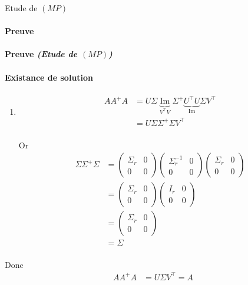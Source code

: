 \documentclass{article}
\newcommand{\img}{\operatorname{Im}}
\newenvironment{proof}[1][\unskip]{
	\def\temp{#1}\ifx\temp\empty
		\paragraph{Preuve}
	\else
		\paragraph{Preuve \emph{(#1)}}
	\fi

}{}
\begin{document}
\begin{proof}[Etude de $(MP)$]
    \paragraph{Existance de solution}
    \begin{enumerate}
        \item \begin{align*}
            A A^+ A &=  U \Sigma \underbrace{\img}_{V^\top V} \Sigma^+ \underbrace{U^\top U}_{\img} \Sigma V^\top \\
            &= U \Sigma \Sigma^+ \Sigma V^\top \\
        \end{align*}

        Or \begin{align*}
            \Sigma \Sigma^+ \Sigma &= \begin{pmatrix} \Sigma_r & 0 \\ 0 & 0 \end{pmatrix}  \begin{pmatrix} \Sigma_r^{-1} & 0 \\ 0 & 0 \end{pmatrix} \begin{pmatrix} \Sigma_r & 0 \\ 0 & 0 \end{pmatrix}  \\
                                   &= \begin{pmatrix} \Sigma_r & 0 \\ 0 & 0 \end{pmatrix} \begin{pmatrix} I_r & 0 \\ 0 & 0 \end{pmatrix} \\
                                   &= \begin{pmatrix} \Sigma_r & 0 \\ 0 & 0 \end{pmatrix}  \\
                                   &= \Sigma \\
        \end{align*}
    \end{enumerate}

    Donc \begin{align*}
        A A^+ A &= U \Sigma V^\top = A \\
    \end{align*}


\end{proof}
\end{document}
